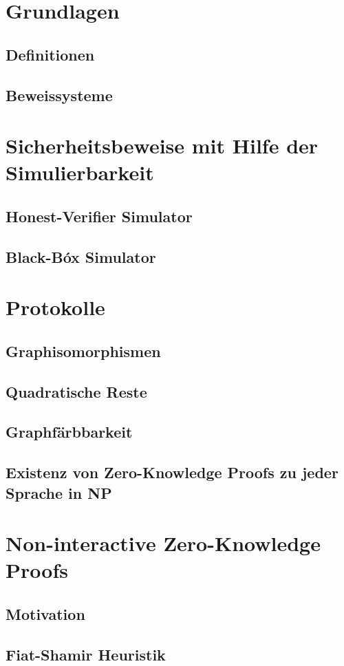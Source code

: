 \documentclass {article}
\begin{document}
\section{Grundlagen}
\subsection{Definitionen}
\subsection{Beweissysteme}
\section{Sicherheitsbeweise mit Hilfe der Simulierbarkeit}
\subsection{Honest-Verifier Simulator}
\subsection{Black-Bóx Simulator}
\section{Protokolle}
\subsection{Graphisomorphismen}
\subsection{Quadratische Reste}
\subsection{Graphfärbbarkeit}
\subsection{Existenz von Zero-Knowledge Proofs zu jeder Sprache in NP }
\section{Non-interactive Zero-Knowledge Proofs}
\subsection{Motivation}
\subsection{Fiat-Shamir Heuristik}
\end{document}
